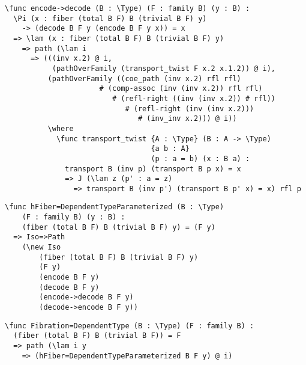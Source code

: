 \begin{ListingEnv}[H]
\begin{lstlisting}
\func encode->decode (B : \Type) (F : family B) (y : B) :
  \Pi (x : fiber (total B F) B (trivial B F) y)
    -> (decode B F y (encode B F y x)) = x
  => \lam (x : fiber (total B F) B (trivial B F) y)
    => path (\lam i
      => (((inv x.2) @ i,
           (pathOverFamily (transport_twist F x.2 x.1.2)) @ i),
          (pathOverFamily ((coe_path (inv x.2) rfl rfl)
                      # (comp-assoc (inv (inv x.2)) rfl rfl)
                         # (refl-right ((inv (inv x.2)) # rfl))
                            # (refl-right (inv (inv x.2)))
                               # (inv_inv x.2))) @ i))
          \where
            \func transport_twist {A : \Type} (B : A -> \Type)
                                  {a b : A}
                                  (p : a = b) (x : B a) :
              transport B (inv p) (transport B p x) = x
              => J (\lam z (p' : a = z)
                => transport B (inv p') (transport B p' x) = x) rfl p
\end{lstlisting}
\end{ListingEnv}

\begin{ListingEnv}[H]
\begin{lstlisting}
\func hFiber=DependentTypeParameterized (B : \Type) 
	(F : family B) (y : B) : 
	(fiber (total B F) B (trivial B F) y) = (F y)
  => Iso=>Path 
  	(\new Iso 
  		(fiber (total B F) B (trivial B F) y) 
  		(F y) 
  		(encode B F y) 
  		(decode B F y) 
  		(encode->decode B F y) 
  		(decode->encode B F y))
\end{lstlisting}
\end{ListingEnv}

\begin{ListingEnv}[H]
\begin{lstlisting}
\func Fibration=DependentType (B : \Type) (F : family B) : 
  (fiber (total B F) B (trivial B F)) = F
  => path (\lam i y
    => (hFiber=DependentTypeParameterized B F y) @ i)
\end{lstlisting}
\end{ListingEnv}

\Conc

\begin{otherlanguage}{english}
\printbibliography[%
    heading=bibintoc%
    ,title=Bibliography
]
\end{otherlanguage}


